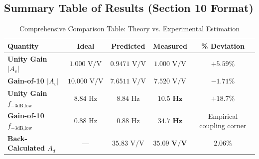 \documentclass[11pt,a4paper]{article}
\begin{document}
\subsection{Summary Table of Results (Section 10 Format)}
\begin{table}[H]
\centering
\caption{Comprehensive Comparison Table: Theory vs. Experimental Estimation}
\label{tab:section10_summary}
\begin{tabular}{@{}lcccc@{}}
\toprule
\textbf{Quantity} & \textbf{Ideal} & \textbf{Predicted} & \textbf{Measured} & \textbf{\% Deviation} \\ \midrule
\textbf{Unity Gain $|A_v|$} & $1.000\text{ V/V}$ & $0.9471\text{ V/V}$ & $1.000\text{ V/V}$ & $+5.59\%$ \\
\textbf{Gain-of-10 $|A_v|$} & $10.000\text{ V/V}$ & $7.6511\text{ V/V}$ & $7.520\text{ V/V}$ & $\mathbf{-1.71\%}$ \\
\textbf{Unity Gain $f_{-3\text{dB,low}}$} & $8.84\text{ Hz}$ & $8.84\text{ Hz}$ & $\mathbf{10.5\text{ Hz}}$ & $+18.7\%$ \\
\textbf{Gain-of-10 $f_{-3\text{dB,low}}$} & $0.88\text{ Hz}$ & $0.88\text{ Hz}$ & $\mathbf{34.7\text{ Hz}}$ & Empirical coupling corner \\
\textbf{Back-Calculated $A_d$} & --- & $35.83\text{ V/V}$ & $\mathbf{35.09\text{ V/V}}$ & $\mathbf{2.06\%}$ \\ \bottomrule
\end{tabular}
\end{table}
\end{document}
